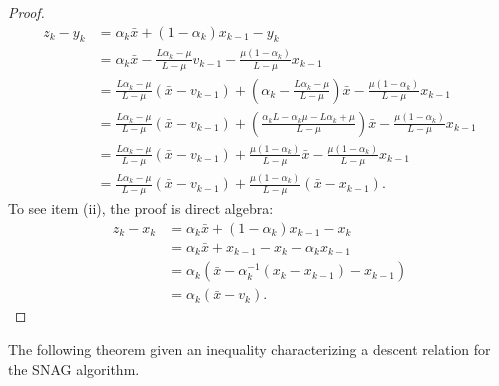 \documentclass[12pt]{article}
\begin{document}
\begin{proof}
            \begin{align*}
                z_k - y_k &= 
                \alpha_k \bar x + (1 - \alpha_k)x_{k - 1} - y_k
                \\
                &= \alpha_k \bar x 
                - \frac{L\alpha_k - \mu}{L - \mu} v_{k - 1} 
                - \frac{\mu(1 - \alpha_k)}{L - \mu} x_{k - 1}
                \\
                &= \frac{L\alpha_k - \mu}{L - \mu}(\bar x - v_{k - 1})
                + \left(
                    \alpha_k - \frac{L\alpha_k - \mu}{L - \mu}
                \right)\bar x
                - \frac{\mu(1 - \alpha_k)}{L - \mu} x_{k - 1}
                \\
                &= \frac{L\alpha_k - \mu}{L - \mu}(\bar x - v_{k - 1})
                + \left(
                    \frac{\alpha_kL - \alpha_k \mu - L\alpha_k + \mu}{L - \mu}
                \right)\bar x
                - \frac{\mu(1 - \alpha_k)}{L - \mu} x_{k - 1}
                \\
                &= \frac{L\alpha_k - \mu}{L - \mu}(\bar x - v_{k - 1})
                + \frac{\mu(1 - \alpha_k)}{L - \mu}\bar x
                - \frac{\mu(1 - \alpha_k)}{L - \mu} x_{k - 1}
                \\
                &= \frac{L\alpha_k - \mu}{L - \mu}(\bar x - v_{k - 1})
                + \frac{\mu(1 - \alpha_k)}{L - \mu}(\bar x - x_{k - 1}).
            \end{align*}
            To see item (ii), the proof is direct algebra: 
            \begin{align*}
                z_k - x_k &= \alpha_k \bar x + (1 - \alpha_k)x_{k - 1} - x_k
                \\
                &= \alpha_k \bar x + x_{k - 1} - x_k - \alpha_k x_{k - 1}
                \\
                &= \alpha_k(\bar x - \alpha_k^{-1}(x_k - x_{k - 1}) - x_{k - 1})
                \\
                &= \alpha_k (\bar x - v_k).
            \end{align*}
        \end{proof}
        The following theorem given an inequality characterizing a descent relation for the SNAG algorithm. 
\end{document}
